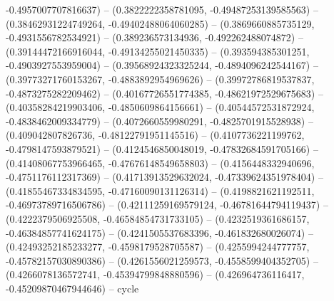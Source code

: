 -0.4957007707816637) -- (0.3822222358781095, -0.49487253139585563) -- (0.38462931224749264, -0.49402488064060285) -- (0.3869660885735129, -0.4931556782534921) -- (0.389236573134936, -0.492262488074872) -- (0.39144472166916044, -0.49134255021450335) -- (0.393594385301251, -0.4903927553959004) -- (0.39568924323325244, -0.4894096242544167) -- (0.39773271760153267, -0.4883892954969626) -- (0.39972786819537837, -0.4873275282209462) -- (0.40167726551774385, -0.48621972529675683) -- (0.40358284219903406, -0.4850609864156661) -- (0.40544572531872924, -0.4838462009334779) -- (0.4072660559980291, -0.4825701915528938) -- (0.409042807826736, -0.48122791951145516) -- (0.4107736221199762, -0.4798147593879521) -- (0.4124546850048019, -0.47832684591705166) -- (0.41408067753966465, -0.47676148549658803) -- (0.4156448332940696, -0.4751176112317369) -- (0.41713913529632024, -0.47339624351978404) -- (0.41855467334834595, -0.47160090131126314) -- (0.4198821621192511, -0.46973789716506786) -- (0.42111259169579124, -0.46781644794119437) -- (0.4222379506925508, -0.46584854731733105) -- (0.4232519361686157, -0.46384857741624175) -- (0.4241505537683396, -0.461832680026074) -- (0.42493252185233277, -0.4598179528705587) -- (0.4255994244777757, -0.45782157030890386) -- (0.4261556021259573, -0.4558599404352705) -- (0.4266078136572741, -0.45394799848880596) -- (0.426964736116417, -0.45209870467944646) -- cycle
